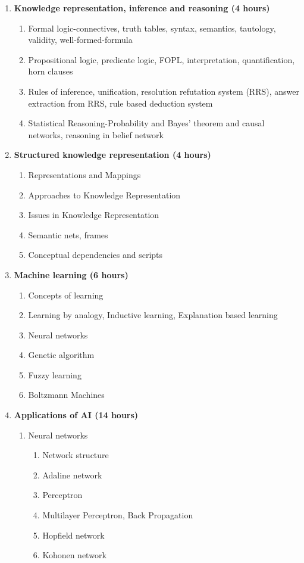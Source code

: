 \begin{enumerate}
  \item \textbf{Knowledge representation, inference and reasoning \hfill (4 hours)}
    \begin{enumerate}
      \item Formal logic-connectives, truth tables, syntax, semantics, tautology, validity, well-formed-formula
      \item Propositional logic, predicate logic, FOPL, interpretation, quantification, horn clauses
      \item Rules of inference, unification, resolution refutation system (RRS), answer extraction from RRS, rule based deduction system
      \item Statistical Reasoning-Probability and Bayes' theorem and causal networks, reasoning in belief network
    \end{enumerate}
    \vs

  \item \textbf{Structured knowledge representation \hfill (4 hours)}
    \begin{enumerate}
      \item Representations and Mappings
      \item Approaches to Knowledge Representation
      \item Issues in Knowledge Representation
      \item Semantic nets, frames
      \item Conceptual dependencies and scripts
    \end{enumerate}
    \vs

  \item \textbf{Machine learning \hfill (6 hours)}
    \begin{enumerate}
      \item Concepts of learning
      \item Learning by analogy, Inductive learning, Explanation based learning
      \item Neural networks
      \item Genetic algorithm
      \item Fuzzy learning
      \item Boltzmann Machines
    \end{enumerate}
    \vs

  \item \textbf{Applications of AI \hfill (14 hours)}
    \begin{enumerate}
      \item Neural networks
        \begin{enumerate}
          \item Network structure
          \item Adaline network
          \item Perceptron
          \item Multilayer Perceptron, Back Propagation
          \item Hopfield network
          \item Kohonen network
        \end{enumerate}


\end{enumerate}
\end{enumerate}
